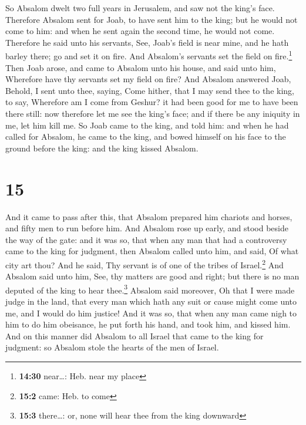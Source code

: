  So Absalom dwelt two full years in Jerusalem, and saw
not the king's face.  Therefore Absalom sent for Joab, to
have sent him to the king; but he would not come to him: and when he
sent again the second time, he would not come.  Therefore
he said unto his servants, See, Joab's field is near mine, and he hath
barley there; go and set it on fire. And Absalom's servants set the
field on fire.\footnote{\textbf{14:30} near\ldots: Heb. near my place}
 Then Joab arose, and came to Absalom unto his house, and
said unto him, Wherefore have thy servants set my field on fire?
 And Absalom answered Joab, Behold, I sent unto thee,
saying, Come hither, that I may send thee to the king, to say, Wherefore
am I come from Geshur? it had been good for me to have been there still:
now therefore let me see the king's face; and if there be any iniquity
in me, let him kill me.  So Joab came to the king, and
told him: and when he had called for Absalom, he came to the king, and
bowed himself on his face to the ground before the king: and the king
kissed Absalom.

\hypertarget{section-14}{%
\section{15}\label{section-14}}

 And it came to pass after this, that Absalom prepared him
chariots and horses, and fifty men to run before him.  And
Absalom rose up early, and stood beside the way of the gate: and it was
so, that when any man that had a controversy came to the king for
judgment, then Absalom called unto him, and said, Of what city art thou?
And he said, Thy servant is of one of the tribes of Israel.\footnote{\textbf{15:2}
  came: Heb. to come}  And Absalom said unto him, See, thy
matters are good and right; but there is no man deputed of the king to
hear thee.\footnote{\textbf{15:3} there\ldots: or, none will hear thee
  from the king downward}  Absalom said moreover, Oh that
I were made judge in the land, that every man which hath any suit or
cause might come unto me, and I would do him justice!  And
it was so, that when any man came nigh to him to do him obeisance, he
put forth his hand, and took him, and kissed him.  And on
this manner did Absalom to all Israel that came to the king for
judgment: so Absalom stole the hearts of the men of Israel.

